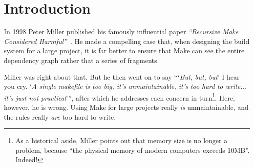 \section{Introduction}

In 1998 Peter Miller published his famously influential paper
\emph{``Recursive Make Considered Harmful''}~\cite{miller:recursive_make}.
He made a compelling case that, when designing the build system for
a large project, it is far better to ensure that Make can see
the entire dependency graph rather that a series of fragments. 

Miller was right about that.  But he then went on to say ```\emph{But, but, but}'
I hear you cry.  `\emph{A single makefile is too big, it's unmaintainable,
it's too hard to write... it's just not practical}''', after which he
addresses each concern in turn\footnote{
As a historical aside, Miller points out that memory size is no
longer a problem, because
``the physical memory of modern computers exceeds 10MB''.  Indeed!}.
Here, however, he is wrong.  Using
Make for large projects really \emph{is} unmaintainable, and the rules really
\emph{are} too hard to write. 

